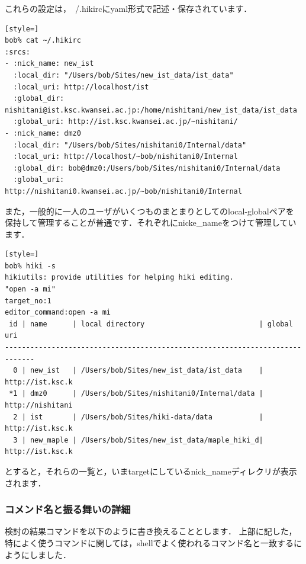 これらの設定は，~/.hikircにyaml形式で記述・保存されています．
\begin{lstlisting}[style=]
bob% cat ~/.hikirc
:srcs:
- :nick_name: new_ist
  :local_dir: "/Users/bob/Sites/new_ist_data/ist_data"
  :local_uri: http://localhost/ist
  :global_dir: nishitani@ist.ksc.kwansei.ac.jp:/home/nishitani/new_ist_data/ist_data
  :global_uri: http://ist.ksc.kwansei.ac.jp/~nishitani/
- :nick_name: dmz0
  :local_dir: "/Users/bob/Sites/nishitani0/Internal/data"
  :local_uri: http://localhost/~bob/nishitani0/Internal
  :global_dir: bob@dmz0:/Users/bob/Sites/nishitani0/Internal/data
  :global_uri: http://nishitani0.kwansei.ac.jp/~bob/nishitani0/Internal
\end{lstlisting}
また，一般的に一人のユーザがいくつものまとまりとしてのlocal-globalペアを
保持して管理することが普通です．それぞれにnicke\_nameをつけて管理しています．
\begin{lstlisting}[style=]
bob% hiki -s
hikiutils: provide utilities for helping hiki editing.
"open -a mi"
target_no:1
editor_command:open -a mi
 id | name      | local directory                           | global uri     
-----------------------------------------------------------------------------
  0 | new_ist   | /Users/bob/Sites/new_ist_data/ist_data    | http://ist.ksc.k
 *1 | dmz0      | /Users/bob/Sites/nishitani0/Internal/data | http://nishitani
  2 | ist       | /Users/bob/Sites/hiki-data/data           | http://ist.ksc.k
  3 | new_maple | /Users/bob/Sites/new_ist_data/maple_hiki_d| http://ist.ksc.k
\end{lstlisting}
とすると，それらの一覧と，いまtargetにしているnick\_nameディレクリが表示されます．

\subsubsection{コメンド名と振る舞いの詳細}
検討の結果コマンドを以下のように書き換えることとします．
上部に記した，特によく使うコマンドに関しては，shellでよく使われるコマンド名と一致するにようにしました．


